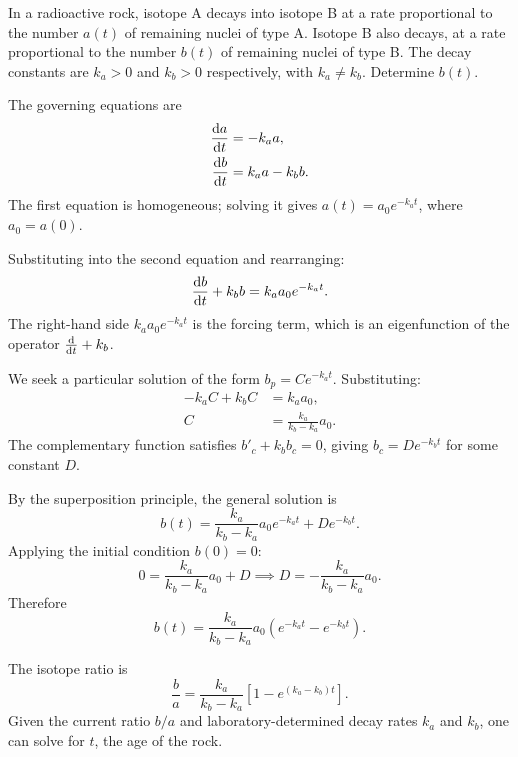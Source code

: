 \documentclass[a4paper]{article}
\begin{document}
\begin{eg}\label{eg:radioactive-decay}
  In a radioactive rock, isotope A decays into isotope B at a rate proportional to the number $a(t)$ of remaining nuclei of type A. Isotope B also decays, at a rate proportional to the number $b(t)$ of remaining nuclei of type B. The decay constants are $k_a > 0$ and $k_b > 0$ respectively, with $k_a \neq k_b$. Determine $b(t)$.

  The governing equations are
  \begin{align*}
    \frac{\mathrm{d} a}{\mathrm{d} t} &= -k_a a,\\
    \frac{\mathrm{d} b}{\mathrm{d} t} &= k_a a - k_b b.
  \end{align*}
  The first equation is homogeneous; solving it gives $a(t) = a_0e^{-k_at}$, where $a_0 = a(0)$.

  Substituting into the second equation and rearranging:
  \[
    \frac{\mathrm{d} b}{\mathrm{d} t} + k_b b = k_aa_0e^{-k_at}.
  \]
  The right-hand side $k_aa_0e^{-k_at}$ is the forcing term, which is an eigenfunction of the operator $\frac{\mathrm{d}}{\mathrm{d} t} + k_b$.

  We seek a particular solution of the form $b_p = Ce^{-k_at}$. Substituting:
  \begin{align*}
    -k_aC + k_bC &= k_a a_0,\\
    C &= \frac{k_a}{k_b - k_a}a_0.
  \end{align*}
  The complementary function satisfies $b'_c + k_bb_c = 0$, giving $b_c = De^{-k_bt}$ for some constant $D$.

  By the superposition principle, the general solution is
  \[
    b(t) = \frac{k_a}{k_b - k_a}a_0 e^{-k_at} + De^{-k_bt}.
  \]
  Applying the initial condition $b(0) = 0$:
  \[
    0 = \frac{k_a}{k_b - k_a}a_0 + D \implies D = -\frac{k_a}{k_b - k_a}a_0.
  \]
  Therefore
  \[
    b(t) = \frac{k_a}{k_b - k_a}a_0\left(e^{-k_at} - e^{-k_bt}\right).
  \]
  \begin{center}
  \end{center}
  The isotope ratio is
  \[
    \frac{b}{a} = \frac{k_a}{k_b - k_a}\left[1 - e^{(k_a - k_b)t}\right].
  \]
  Given the current ratio $b/a$ and laboratory-determined decay rates $k_a$ and $k_b$, one can solve for $t$, the age of the rock.
\end{eg}
\end{document}
